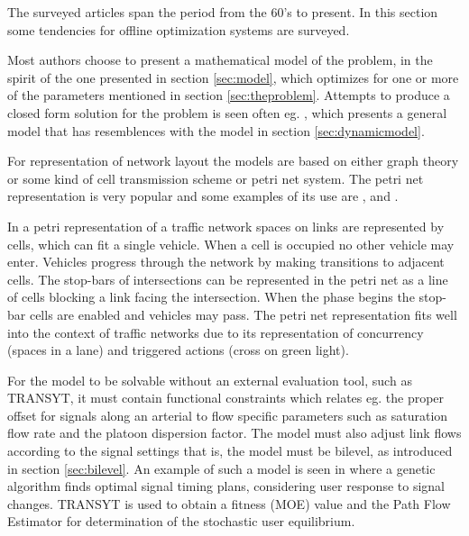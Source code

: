 \label{sec:offline}

The surveyed articles span the period from the 60's to present. In
this section some tendencies for offline optimization systems are
surveyed.

Most authors choose to present a mathematical model of the problem, in
the spirit of the one presented in section \ref{sec:model}, which
optimizes for one or more of the parameters mentioned in section
\ref{sec:theproblem}. Attempts to produce a closed form solution for the
problem is seen often eg. \cite{36}, which presents a general model
that has resemblences with the model in section \ref{sec:dynamicmodel}.

For representation of network layout the models are based on either
graph theory or some kind of cell transmission scheme or petri net
system. The petri net representation is very popular and some examples
of its use are \cite{12}, \cite{16} and \cite{petri}.

In a petri representation of a traffic network spaces on links are
represented by cells, which can fit a single vehicle. When a cell is
occupied no other vehicle may enter. Vehicles progress through the
network by making transitions to adjacent cells. The stop-bars of
intersections can be represented in the petri net as a line of cells
blocking a link facing the intersection. When the phase begins the
stop-bar cells are enabled and vehicles may pass.  The petri net
representation fits well into the context of traffic networks due to
its representation of concurrency (spaces in a lane) and triggered
actions (cross on green light).

For the model to be solvable without an external evaluation tool, such
as TRANSYT, it must contain functional constraints which relates
eg. the proper offset for signals along an arterial to flow specific
parameters such as saturation flow rate and the platoon dispersion
factor.  The model must also adjust link flows according to the signal
settings that is, the model must be bilevel, as introduced in section
\ref{sec:bilevel}. An example of such a model is seen in \cite{33} where a
genetic algorithm finds optimal signal timing plans, considering user
response to signal changes. TRANSYT is used to obtain a fitness (MOE)
value and the Path Flow Estimator for determination of the stochastic
user equilibrium.

